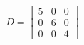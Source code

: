 \documentclass[preview]{standalone}
\begin{document}
\begin{align*}
D = \begin{bmatrix} 5 & 0 & 0 \\ 0 & 6 & 0 \\ 0 & 0 & 4 \end{bmatrix}
\end{align*}
\end{document}
